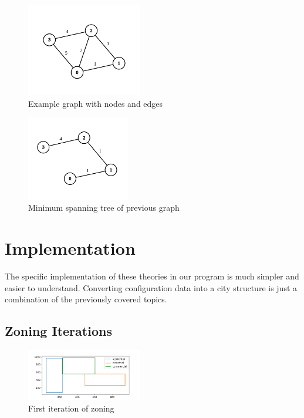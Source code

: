 \documentclass[11pt]{article}
\begin{document}
\begin{multicols}{2}
    \begin{figure}[H]
        \centering
        \includegraphics[width=0.45\textwidth]{images/graph.png}
        \caption{Example graph with nodes and edges \cite{graphs}}
        \label{fig:full-graph}
    \end{figure}

    \begin{figure}[H]
        \centering
        \includegraphics[width=0.4\textwidth]{images/mst.png}
        \caption{Minimum spanning tree of previous graph \cite{graphs}}
        \label{fig:mst-graph}
    \end{figure}

    \section{Implementation}

    \quad The specific implementation of these theories in our program is much simpler and easier to understand. Converting configuration data into a city structure is just a combination of the previously covered topics.
    
    \subsection{Zoning Iterations} \label{zoning-implementation}

    \begin{figure}[H]
        \centering
        \vspace{-3em}
        \includegraphics[width=0.45\textwidth]{images/first-zoning.png}
        \caption{First iteration of zoning}
        \label{fig:first-zoning}
    \end{figure}


\end{multicols}
\end{document}
